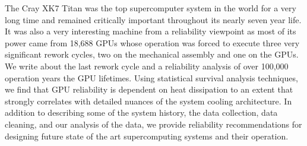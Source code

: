 
The Cray XK7 Titan was the top supercomputer system in the world for a
very long time and remained critically important throughout its nearly
seven year life. It was also a very interesting machine from a
reliability viewpoint as most of its power came from 18,688 GPUs whose
operation was forced to execute three very significant rework cycles,
two on the mechanical assembly and one on the GPUs. We write about the
last rework cycle and a reliability analysis of over 100,000 operation
years the GPU lifetimes. Using statistical survival analysis
techniques, we find that GPU reliability is dependent on heat
dissipation to an extent that strongly correlates with detailed
nuances of the system cooling architecture. In addition to describing
some of the system history, the data collection, data cleaning, and
our analysis of the data, we provide reliability recommendations for
designing future state of the art supercomputing systems and their
operation.
